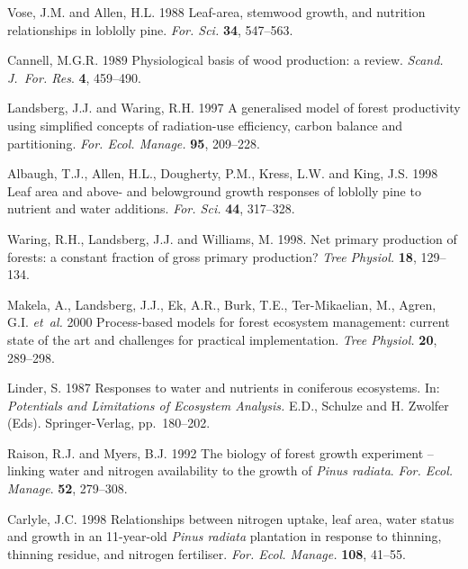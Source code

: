 \documentclass[final]{foresj}
\begin{document}
\begin{thebibliography}

Vose, J.M. and Allen, H.L. 1988 Leaf-area, stemwood growth,
and nutrition relationships in loblolly pine. \textit{For.
Sci.} \textbf{34}, 547--563.

Cannell, M.G.R. 1989 Physiological basis of wood
production: a review. \textit{Scand. J.~For. Res}.
\textbf{4}, 459--490.

Landsberg, J.J. and Waring, R.H. 1997 A generalised model
of forest productivity using simplified concepts of
radiation-use efficiency, carbon balance and partitioning.
\textit{For. Ecol. Manage.} \textbf{95}, 209--228.

Albaugh, T.J., Allen, H.L., Dougherty, P.M., Kress, L.W.
and King, J.S. 1998 Leaf area and above- and belowground
growth responses of loblolly pine to nutrient and water
additions. \textit{For. Sci.} \textbf{44}, 317--328.

Waring, R.H., Landsberg, J.J. and Williams, M. 1998. Net
primary production of forests: a constant fraction of gross
primary production? \textit{Tree Physiol.} \textbf{18},
129--134.

Makela, A., Landsberg, J.J., Ek, A.R., Burk, T.E.,
Ter-Mikaelian, M., Agren, G.I. \textit{et~al.} 2000
Process-based models for forest ecosystem management:
current state of the art and challenges for practical
implementation. \textit{Tree Physiol.} \textbf{20},
289--298.

Linder, S. 1987 Responses to water and nutrients in
coniferous ecosystems. In: \textit{Potentials and
Limitations of Ecosystem Analysis. }E.D., Schulze and H.
Zwolfer (Eds). Springer-Verlag, pp.~180--202.

Raison, R.J. and Myers, B.J. 1992 The biology of forest
growth experiment -- linking water and nitrogen
availability to the growth of \textit{Pinus radiata}.
\textit{For. Ecol. Manage}. \textbf{52}, 279--308.

Carlyle, J.C. 1998 Relationships between nitrogen uptake,
leaf area, water status and growth in an 11-year-old
\textit{Pinus radiata} plantation in response to thinning,
thinning residue, and nitrogen fertiliser. \textit{For.
Ecol. Manage.} \textbf{108}, 41--55.


\end{thebibliography}
\end{document}

